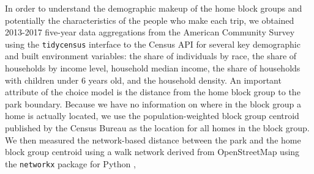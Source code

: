 \documentclass[3p, authoryear, review]{elsarticle} %
\begin{document}
In order to understand the demographic makeup of the home block groups and
potentially the characteristics of the people who make each trip, we obtained
2013-2017 five-year data aggregations from the American Community Survey
using the \texttt{tidycensus} \citep{Walker2019} interface to the
Census API for several key demographic and built environment variables: the
share of individuals by race, the share of households by income level,
household median income, the share of households with children under 6 years old,
and the household density. An important attribute of
the choice model is the distance from the home block group to the park boundary.
Because we have no information on where in the block group a home is actually
located, we use the population-weighted block group centroid published by the
Census Bureau as the location for all homes in the block group. We then measured
the network-based distance between the park and the home block group centroid
using a walk network derived from OpenStreetMap using the \texttt{networkx} package
for Python \citep{networkx},

\begin{table}

\caption{\label{tab:acs-table}Block Group Summary Statistics}
\centering
{}
\end{table}
\end{document}
